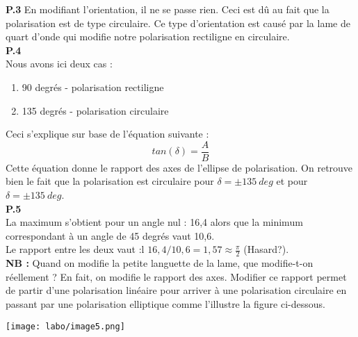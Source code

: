 \documentclass[british,french,11pt, a4paper, openany]{book}
\begin{document}
		\textbf{P.3}
		En modifiant l'orientation, il ne se passe rien. Ceci est dû au fait que la polarisation est de type circulaire. Ce type d'orientation est causé par la lame de quart d'onde qui modifie notre polarisation rectiligne en circulaire.\\
		 
		\textbf{P.4}\\
		Nous avons ici deux cas : 
		\begin{enumerate}
			\item 90 degrés - polarisation rectiligne
			\item 135 degrés - polarisation circulaire
		\end{enumerate}
		Ceci s'explique sur base de l'équation suivante : 
		\begin{equation}
			tan(\delta) = \frac{A}{B}
		\end{equation}
		Cette équation donne le rapport des axes de l'ellipse de polarisation. On retrouve bien le fait que la polarisation est circulaire pour $\delta = \pm 135\ deg$ et pour $\delta = \pm 135\ deg$.\\
		
		\textbf{P.5}\\
		La maximum s'obtient pour un angle nul : 16,4 alors que la minimum correspondant à un angle de 45 degrés vaut 10,6.\\
		Le rapport entre les deux vaut :l $16,4/10,6 = 1,57 \approx \frac{\pi}{2}$ (Hasard?).\\
		
		\textbf{NB :} Quand on modifie la petite languette de la lame, que modifie-t-on réellement ? En fait, on modifie le rapport des axes. Modifier ce rapport permet de partir d'une polarisation linéaire pour arriver à une polarisation circulaire en passant par une polarisation elliptique comme l'illustre la figure ci-dessous.
		\begin{center}
			\texttt{[image: labo/image5.png]}
		\end{center}
		
\end{document}
